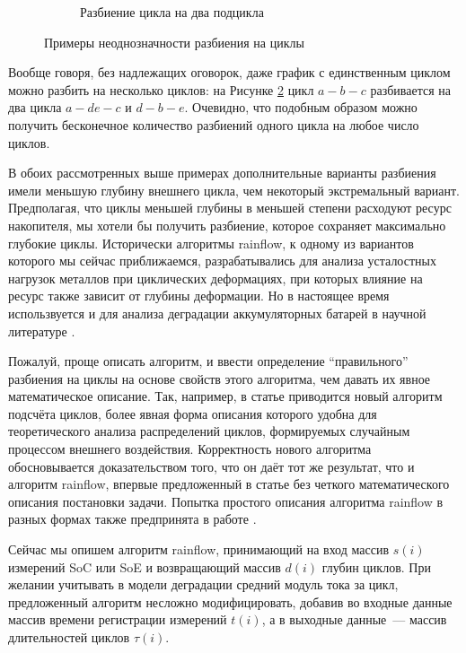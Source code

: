 \begin{enumerate}
\begin{figure}[h]
\begin{subfigure}[b]{0.45\textwidth}
\caption{Разбиение цикла на два подцикла}
\label{fig:one-cycle}
\end{subfigure}
\caption{Примеры неоднозначности разбиения на циклы}
\end{figure}

Вообще говоря, без надлежащих оговорок, даже график с единственным циклом можно разбить на несколько циклов: на Рисунке \ref{fig:one-cycle} цикл $a-b-c$ разбивается на два цикла $a-de-c$ и $d-b-e$.
Очевидно, что подобным образом можно получить бесконечное количество разбиений одного цикла на любое число циклов.

В обоих рассмотренных выше примерах дополнительные варианты разбиения имели меньшую глубину внешнего цикла, чем некоторый экстремальный вариант.
Предполагая, что циклы меньшей глубины в меньшей степени расходуют ресурс накопителя, мы хотели бы получить разбиение, которое сохраняет максимально глубокие циклы.
Исторически алгоритмы rainflow, к одному из вариантов которого мы сейчас приближаемся, разрабатывались для анализа усталостных нагрузок металлов при циклических деформациях, при которых влияние на ресурс также зависит от глубины деформации.
Но в настоящее время использвуется и для анализа деградации аккумуляторных батарей в научной литературе \cite{xu2016modeling}.

Пожалуй, проще описать алгоритм, и ввести определение ``правильного'' разбиения на циклы на основе свойств этого алгоритма, чем давать их явное математическое описание.
Так, например, в статье \cite{rychlik1987new} приводится новый алгоритм подсчёта циклов, более явная форма описания которого удобна для теоретического анализа распределений циклов, формируемых случайным процессом внешнего воздействия.
Корректность нового алгоритма обосновывается доказательством того, что он даёт тот же результат, что и алгоритм rainflow, впервые предложенный в статье \cite{matsuishi1968fatigue} без четкого математического описания постановки задачи.
Попытка простого описания алгоритма rainflow в разных формах также предпринята в работе \cite{downing1982simple}.

Сейчас мы опишем алгоритм rainflow, принимающий на вход массив $s(i)$ измерений SoC или SoE и возвращающий массив $d(i)$ глубин циклов.
При желании учитывать в модели деградации средний модуль тока за цикл, предложенный алгоритм несложно модифицировать, добавив во входные данные массив времени регистрации измерений $t(i)$, а в выходные данные~--- массив длительностей циклов $\tau(i)$.


\end{enumerate}
